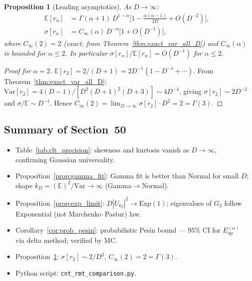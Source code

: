 \documentclass[12pt,a4paper]{article}
\newtheorem{proposition}[theorem]{Proposition}
\begin{document}
\begin{proposition}[Leading asymptotics]\label{prop:ld_asymptotics}
As $D\to\infty$:
\begin{align}
  \mathbb{E}[r_\alpha] &= \Gamma(\alpha+1)\,D^{1-\alpha}\bigl[1 - \tfrac{\alpha(\alpha-1)}{2D} + O(D^{-2})\bigr],\\
  \sigma[r_\alpha] &= C_\infty(\alpha)\,D^{-\alpha}\bigl[1+O(D^{-1})\bigr],
\end{align}
where $C_\infty(2)=2$ (exact, from Theorem~\ref{thm:exact_var_all_D}) and $C_\infty(\alpha)$
is bounded for $\alpha\leq2$.
In particular $\sigma[r_\alpha]/\mathbb{E}[r_\alpha]=O(D^{-1})$ for $\alpha\leq2$.
\end{proposition}

\begin{proof}[Proof for $\alpha=2$]
$\mathbb{E}[r_2]=2/(D+1)=2D^{-1}(1-D^{-1}+\cdots)$.
From Theorem~\ref{thm:exact_var_all_D}: $\mathrm{Var}[r_2]=4(D-1)/[D^2(D+1)^2(D+3)]
\sim 4D^{-4}$, giving $\sigma[r_2]\sim 2D^{-2}$ and $\sigma/\mathbb{E}\sim D^{-1}$.
Hence $C_\infty(2) = \lim_{D\to\infty}\sigma[r_2]\cdot D^2 = 2 = \Gamma(3)$.
\end{proof}

\subsection*{Summary of Section~50}
\begin{itemize}
\item Table~\ref{tab:clt_precision}: skewness and kurtosis vanish as $D\to\infty$,
  confirming Gaussian universality.
\item Proposition~\ref{prop:gamma_fit}: Gamma fit is better than Normal for small $D$;
  shape $k_D=(\mathbb{E})^2/\mathrm{Var}\to\infty$ (Gamma$\to$Normal).
\item Proposition~\ref{prop:exp_limit}: $D|U_{kj}|^2\to\mathrm{Exp}(1)$;
  eigenvalues of $G_2$ follow Exponential (not Marchenko--Pastur) law.
\item Corollary~\ref{cor:prob_pesin}: probabilistic Pesin bound — $95\%$ CI for
  $E_\mathrm{op}^{(\alpha)}$ via delta method; verified by MC.
\item Proposition~\ref{prop:ld_asymptotics}: $\sigma[r_2]\sim2/D^2$, $C_\infty(2)=2=\Gamma(3)$.
\item Python script: \texttt{cnt\_rmt\_comparison.py}.
\end{itemize}

\end{document}
